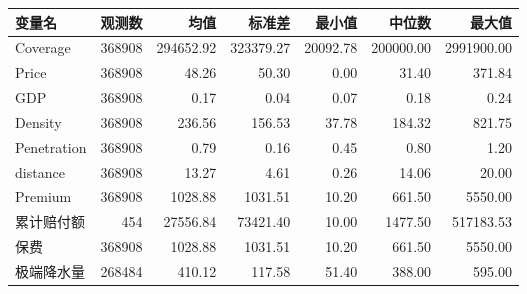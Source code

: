 \begin{tabular}{lrrrrrr}
    \toprule
    变量名         & 观测数    & 均值        & 标准差       & 最小值      & 中位数       & 最大值        \\
    \midrule
    Coverage    & 368908 & 294652.92 & 323379.27 & 20092.78 & 200000.00 & 2991900.00 \\
    Price       & 368908 & 48.26     & 50.30     & 0.00     & 31.40     & 371.84     \\
    GDP         & 368908 & 0.17      & 0.04      & 0.07     & 0.18      & 0.24       \\
    Density     & 368908 & 236.56    & 156.53    & 37.78    & 184.32    & 821.75     \\
    Penetration & 368908 & 0.79      & 0.16      & 0.45     & 0.80      & 1.20       \\
    distance    & 368908 & 13.27     & 4.61      & 0.26     & 14.06     & 20.00      \\
    Premium     & 368908 & 1028.88   & 1031.51   & 10.20    & 661.50    & 5550.00    \\
    累计赔付额       & 454    & 27556.84  & 73421.40  & 10.00    & 1477.50   & 517183.53  \\
    保费          & 368908 & 1028.88   & 1031.51   & 10.20    & 661.50    & 5550.00    \\
    极端降水量       & 268484 & 410.12   & 117.58    & 51.40   & 388.00   & 595.00    \\
    \bottomrule
\end{tabular}
